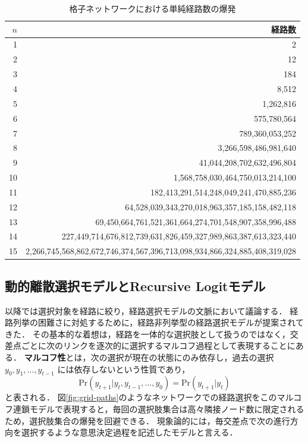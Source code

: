 \begin{table}[tb]
\centering
\caption{格子ネットワークにおける単純経路数の爆発}
\label{tab:simple-paths}
\begin{tabular}{r r}
\hline
$n$ & 経路数 \\
\hline
1  & 2 \\
2  & 12 \\
3  & 184 \\
4  & 8,512 \\
5  & 1,262,816 \\
6  & 575,780,564 \\
7  & 789,360,053,252 \\
8  & 3,266,598,486,981,640 \\
9  & 41,044,208,702,632,496,804 \\
10 & 1,568,758,030,464,750,013,214,100 \\
11 & 182,413,291,514,248,049,241,470,885,236 \\
12 & 64,528,039,343,270,018,963,357,185,158,482,118 \\
13 & 69,450,664,761,521,361,664,274,701,548,907,358,996,488 \\
14 & 227,449,714,676,812,739,631,826,459,327,989,863,387,613,323,440 \\
15 & 2,266,745,568,862,672,746,374,567,396,713,098,934,866,324,885,408,319,028 \\
\hline
\end{tabular}
\end{table}


\subsection{動的離散選択モデルとRecursive Logitモデル}\label{ssec:recursive_logit}
以降では選択対象を経路に絞り，経路選択モデルの文脈において議論する．
経路列挙の困難さに対処するために，経路非列挙型の経路選択モデルが提案されてきた．
その基本的な着想は，経路を一体的な選択肢として扱うのではなく，交差点ごとに次のリンクを逐次的に選択するマルコフ過程として表現することにある．
\textbf{マルコフ性}とは，次の選択が現在の状態にのみ依存し，過去の選択 $y_0, y_1, \ldots, y_{t-1}$ には依存しないという性質であり，
\begin{equation}
  \text{Pr}(y_{t+1} | y_t, y_{t-1}, \ldots, y_0) = \text{Pr}(y_{t+1} | y_t)
\end{equation}
と表される．
図\ref{fig:grid-paths}のようなネットワークでの経路選択をこのマルコフ連鎖モデルで表現すると，毎回の選択肢集合は高々隣接ノード数に限定されるため，選択肢集合の爆発を回避できる．
現象論的には，毎交差点で次の進行方向を選択するような意思決定過程を記述したモデルと言える．

